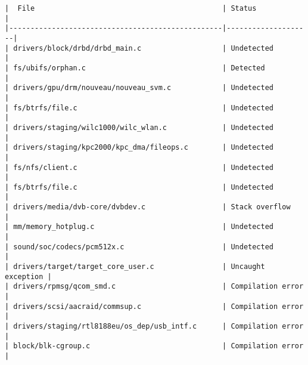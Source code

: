 \begin{verbatim}
|  File                                            | Status             | 
|--------------------------------------------------|--------------------|
| drivers/block/drbd/drbd_main.c                   | Undetected         | 
| fs/ubifs/orphan.c                                | Detected           | 
| drivers/gpu/drm/nouveau/nouveau_svm.c            | Undetected         | 
| fs/btrfs/file.c                                  | Undetected         | 
| drivers/staging/wilc1000/wilc_wlan.c             | Undetected         | 
| drivers/staging/kpc2000/kpc_dma/fileops.c        | Undetected         | 
| fs/nfs/client.c                                  | Undetected         | 
| fs/btrfs/file.c                                  | Undetected         | 
| drivers/media/dvb-core/dvbdev.c                  | Stack overflow     | 
| mm/memory_hotplug.c                              | Undetected         | 
| sound/soc/codecs/pcm512x.c                       | Undetected         | 
| drivers/target/target_core_user.c                | Uncaught exception | 
| drivers/rpmsg/qcom_smd.c                         | Compilation error  | 
| drivers/scsi/aacraid/commsup.c                   | Compilation error  | 
| drivers/staging/rtl8188eu/os_dep/usb_intf.c      | Compilation error  | 
| block/blk-cgroup.c                               | Compilation error  | 
\end{verbatim}